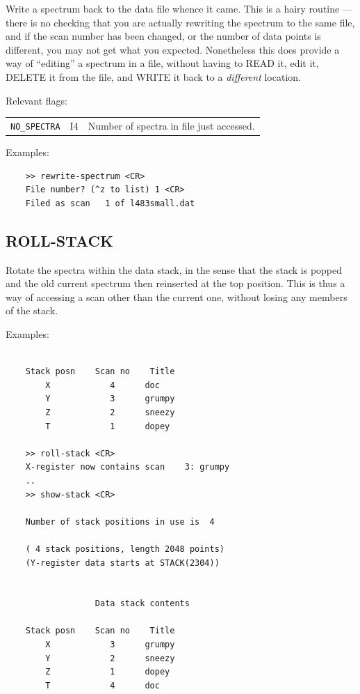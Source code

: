 \documentclass[11pt,twoside]{report}
\begin{document}
Write a spectrum back to the data file whence it came. This is a hairy
routine --- there is no checking that you are actually rewriting the spectrum
to the same file, and if the scan number has been changed, or the number of
data points is different, you may not get what you expected. Nonetheless this
does provide a way of ``editing'' a spectrum in a file, without having to 
READ it, edit it, DELETE it from the file, and WRITE it back to a {\em
different} location.

Relevant flags:\\
\begin{tabular}{lll}
  \verb+NO_SPECTRA+  & I4 & Number of spectra in file just accessed.
\end{tabular}

Examples:
\begin{verbatim}
    >> rewrite-spectrum <CR>
    File number? (^z to list) 1 <CR>
    Filed as scan   1 of l483small.dat                           

\end{verbatim}

\subsection{ROLL-STACK} 

Rotate the spectra within the data stack, in the sense that the stack is 
popped and the old current spectrum then reinserted at the top position.
This is thus a way of accessing a scan other than the current one, without
losing any members of the stack.

Examples:
\begin{verbatim}

    Stack posn    Scan no    Title
        X            4      doc                       
        Y            3      grumpy                    
        Z            2      sneezy                    
        T            1      dopey                     

    >> roll-stack <CR>
    X-register now contains scan    3: grumpy
    ..
    >> show-stack <CR>

    Number of stack positions in use is  4

    ( 4 stack positions, length 2048 points)
    (Y-register data starts at STACK(2304))
 

                  Data stack contents

    Stack posn    Scan no    Title
        X            3      grumpy                    
        Y            2      sneezy                    
        Z            1      dopey                     
        T            4      doc                       

\end{verbatim}
\end{document}
